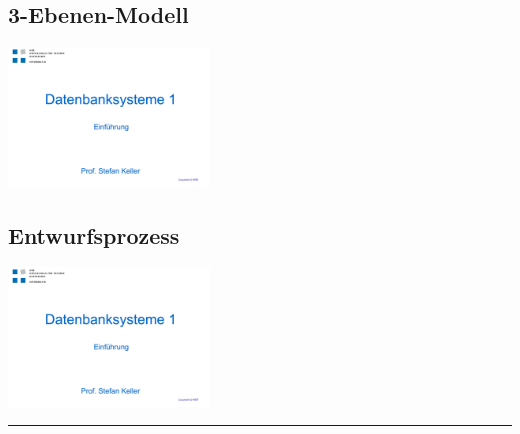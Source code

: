     \begin{multicols}{2}            
        \subsection{3-Ebenen-Modell}
            \includegraphics[page=22,trim=20 40 20 100,clip=true,width=0.4\textwidth]{images/einfuehrung.pdf}
        \subsection{Entwurfsprozess}
            \includegraphics[page=26,trim=20 20 20 85,clip=true,width=0.4\textwidth]{images/einfuehrung.pdf}
    \end{multicols}
    \hrule  